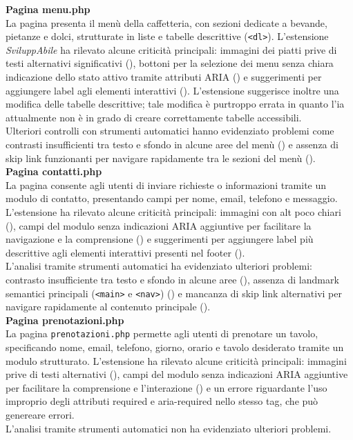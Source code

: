 \noindent \textbf{Pagina menu.php}\\
La pagina presenta il menù della caffetteria, con sezioni dedicate a bevande, pietanze e dolci, strutturate in liste e tabelle descrittive (\texttt{<dl>}). 
L’estensione \textit{SviluppAbile} ha rilevato alcune criticità principali: immagini dei piatti prive di testi alternativi significativi ({}), bottoni per la selezione dei menu senza chiara indicazione dello stato attivo tramite attributi ARIA ({}) e suggerimenti per aggiungere label agli elementi interattivi ({}). L'estensione suggerisce inoltre una modifica delle tabelle descrittive; tale modifica è purtroppo errata in quanto l'\acrshort{ia} attualmente non è in grado di creare correttamente tabelle accessibili.\\
Ulteriori controlli con strumenti automatici hanno evidenziato problemi come contrasti insufficienti tra testo e sfondo in alcune aree del menù ({}) e assenza di skip link funzionanti per navigare rapidamente tra le sezioni del menù ({}).\\

\noindent \textbf{Pagina contatti.php}\\
La pagina consente agli utenti di inviare richieste o informazioni tramite un modulo di contatto, presentando campi per nome, email, telefono e messaggio. L’estensione ha rilevato alcune criticità principali: immagini con alt poco chiari ({}), campi del modulo senza indicazioni ARIA aggiuntive per facilitare la navigazione e la comprensione ({}) e suggerimenti per aggiungere label più descrittive agli elementi interattivi presenti nel footer ({}).\\
L’analisi tramite strumenti automatici ha evidenziato ulteriori problemi: contrasto insufficiente tra testo e sfondo in alcune aree ({}), assenza di landmark semantici principali (\texttt{<main>} e \texttt{<nav>}) ({}) e mancanza di skip link alternativi per navigare rapidamente al contenuto principale ({}).\\

\noindent \textbf{Pagina prenotazioni.php}\\
La pagina \texttt{prenotazioni.php} permette agli utenti di prenotare un tavolo, specificando nome, email, telefono, giorno, orario e tavolo desiderato tramite un modulo strutturato. L’estensione ha rilevato alcune criticità principali: immagini prive di testi alternativi ({}), campi del modulo senza indicazioni ARIA aggiuntive per facilitare la comprensione e l’interazione ({}) e un errore riguardante l'uso improprio degli attributi required e aria-required nello stesso tag, che può genereare errori.\\
L’analisi tramite strumenti automatici non ha evidenziato ulteriori problemi.\\

